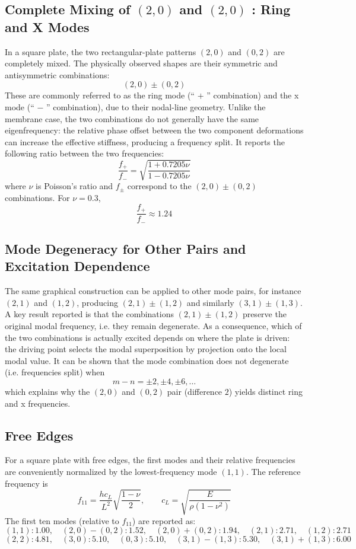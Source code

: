 \subsection{Complete Mixing of \texorpdfstring{ \( (2,0) \) }{(2,0)} and \texorpdfstring{ \( (2,0) \) }{(2,0)}: Ring and X Modes}

In a square plate, the two rectangular-plate patterns \( (2,0) \) and \( (0,2) \) are completely mixed. The physically observed shapes are their symmetric and antisymmetric combinations:
\[
(2,0)\pm(0,2)
\]
These are commonly referred to as the ring mode (`` \( + \) '' combination) and the x mode (`` \( - \) '' combination), due to their nodal-line geometry. Unlike the membrane case, the two combinations do not generally have the same eigenfrequency: the relative phase offset between the two component deformations can increase the effective stiffness, producing a frequency split. It reports the following ratio between the two frequencies:
\[
\frac{f_{+}}{f_{-}}
 = 
\sqrt{\frac{1+0.7205\nu}{1-0.7205\nu}}
\]
where \( \nu \) is Poisson's ratio and \( f_{\pm} \) correspond to the \( (2,0)\pm(0,2) \) combinations. For \( \nu = 0.3 \),
\[
\frac{f_{+}}{f_{-}} \approx 1.24
\]

\subsection{Mode Degeneracy for Other Pairs and Excitation Dependence}

The same graphical construction can be applied to other mode pairs, for instance \( (2,1) \) and \( (1,2) \), producing \( (2,1)\pm(1,2) \) and similarly \( (3,1)\pm(1,3) \). A key result reported is that the combinations \( (2,1)\pm(1,2) \) preserve the original modal frequency, i.e. they remain degenerate. As a consequence, which of the two combinations is actually excited depends on where the plate is driven: the driving point selects the modal superposition by projection onto the local modal value. It can be shown that the mode combination does not degenerate (i.e. frequencies split) when
\[
m-n = \pm 2,\pm 4,\pm 6,\dots
\]
which explains why the \( (2,0) \) and \( (0,2) \) pair (difference \( 2 \)) yields distinct ring and x frequencies.

\subsection{Free Edges}

For a square plate with free edges, the first modes and their relative frequencies are conveniently normalized by the lowest-frequency mode \( (1,1) \). The reference frequency is
\[
f_{11} = \frac{h c_L}{L^{2}}\sqrt{\frac{1-\nu}{2}},
\qquad
c_L = \sqrt{\frac{E}{\rho(1-\nu^{2})}}
\]
The first ten modes (relative to \( f_{11} \)) are reported as:
\[
(1,1):1.00,\quad
(2,0)-(0,2):1.52,\quad
(2,0)+(0,2):1.94,\quad
(2,1):2.71,\quad
(1,2):2.71
\]
\[
(2,2):4.81,\quad
(3,0):5.10,\quad
(0,3):5.10,\quad
(3,1)-(1,3):5.30,\quad
(3,1)+(1,3):6.00
\]

